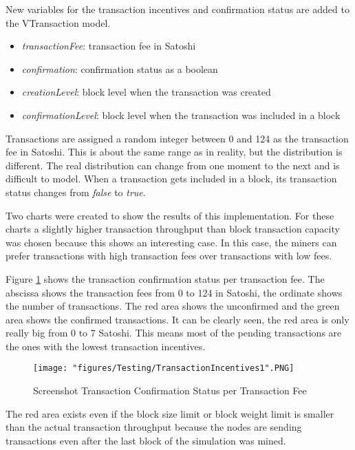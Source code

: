 New variables for the transaction incentives and confirmation status are added to the VTransaction model. 

\begin{itemize}
\item \textit{transactionFee}: transaction fee in Satoshi
\item \textit{confirmation}: confirmation status as a boolean
\item \textit{creationLevel}: block level when the transaction was created
\item \textit{confirmationLevel}: block level when the transaction was included in a block
\end{itemize}

Transactions are assigned a random integer between 0 and 124 as the transaction fee in Satoshi. This is about the same range as in reality, but the distribution is different. The real distribution can change from one moment to the next and is difficult to model. When a transaction gets included in a block, its transaction status changes from \textit{false} to \textit{true}.

Two charts were created to show the results of this implementation. For these charts a slightly higher transaction throughput than block transaction capacity was chosen because this shows an interesting case. In this case, the miners can prefer transactions with high transaction fees over transactions with low fees.

Figure \ref{fig:TransactionIncentives1} shows the transaction confirmation status per transaction fee. The abscissa shows the transaction fees from 0 to 124 in Satoshi, the ordinate shows the number of transactions. The red area shows the unconfirmed and the green area shows the confirmed transactions. It can be clearly seen, the red area is only really big from 0 to 7 Satoshi. This means most of the pending transactions are the ones with the lowest transaction incentives.

\begin{figure}[!htb]
\centering
\texttt{[image: "figures/Testing/TransactionIncentives1".PNG]}
\caption{Screenshot Transaction Confirmation Status per Transaction Fee
\label{fig:TransactionIncentives1}}
\end{figure}

The red area exists even if the block size limit or block weight limit is smaller than the actual transaction throughput because the nodes are sending transactions even after the last block of the simulation was mined.

